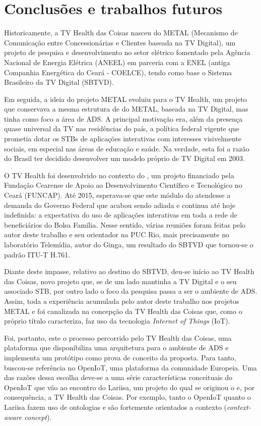 \chapter{Conclusões e trabalhos futuros} \label{cap:conclusao}

Historicamente, a TV Health das Coisas nasceu do METAL (Mecanismo de
Comunicação entre Concessionárias e Clientes baseada na TV Digital), um projeto
de pesquisa e desenvolvimento no setor elétrico fomentado pela Agência Nacional
de Energia Elétrica (ANEEL) em parceria com a ENEL (antiga Companhia Energética
do Ceará - COELCE), tendo como base o Sistema Brasileiro da TV Digital (SBTVD). 

Em seguida, a ideia do projeto METAL evoluiu para o TV Health, um projeto que
conservava a mesma estrutura de \hardware[] do METAL, baseada na TV Digital,
mas tinha como foco a área de ADS. A principal motivação era, além da presença
quase universal da TV nas residências do país, a política federal vigente que prometia
dotar os STBs de aplicações interativas com interesses visivelmente sociais,
em especial nas áreas de educação e saúde. Na verdade, esta foi a razão do Brasil
ter decidido desenvolver um modelo próprio de TV Digital em 2003.

O TV Health foi desenvolvido no contexto do \nextsaude, um projeto financiado
pela Fundação Cearense de Apoio ao Desenvolvimento Científico e Tecnológico
no Ceará (FUNCAP). Até 2015, esperava-se que este módulo do \nextsaude[]
atendesse a demanda do Governo Federal que acabou sendo adiada e continua até
hoje indefinida: a expectativa do uso de aplicações interativas em toda a rede
de beneficiários do Bolsa Família. Nesse sentido, várias reuniões foram feitas
pelo autor deste trabalho e seu orientador na PUC Rio, mais precisamente no
laboratório Telemídia, autor do \middleware[] Ginga, um resultado do SBTVD que
tornou-se o padrão ITU-T H.761.

Diante deste impasse, relativo ao destino do SBTVD, deu-se início ao TV Health
das Coisas, novo projeto que, se de um lado mantinha a TV Digital e o seu associado
STB, por outro lado o foco da pesquisa passa a ser o ambiente de ADS. Assim,
toda a experiência acumulada pelo autor deste trabalho nos projetos METAL e
\nextsaude[] foi canalizada na concepção da TV Health das Coisas que, como o próprio
título caracteriza, faz uso da tecnologia \textit{Internet of Things} (IoT).

Foi, portanto, este o processo percorrido pelo TV Health das Coisas, uma plataforma
que disponibiliza uma arquitetura para o ambiente de ADS e implementa um protótipo 
como prova de conceito da proposta. Para tanto, buscou-se referência no OpenIoT,
uma plataforma da comunidade Europeia. Uma das razões dessa escolha deve-se a
uma série características conceituais do OpenIoT que vão ao encontro do Lariisa,
um projeto do qual se originou o \nextsaude[] e, por consequência, a TV Health
das Coisas. Por exemplo, tanto o OpenIoT quanto o Lariisa fazem uso de ontologias
e são fortemente orientados a contexto (\textit{context-aware concept}). 

